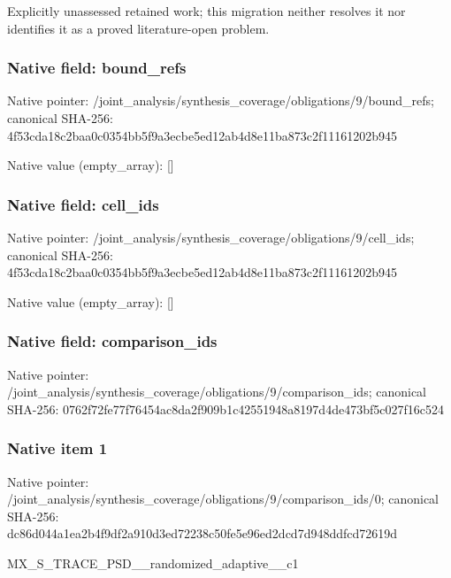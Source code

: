 \documentclass[10pt,a4paper]{article}
\begin{document}
\begingroup\raggedright\sloppy Explicitly unassessed retained work;\allowbreak{} this migration neither resolves it nor identifies it as a proved literature-open problem.\par\endgroup

\subsubsection{Native field: bound\_\allowbreak{}refs}
Native pointer: /joint\_\allowbreak{}analysis/synthesis\_\allowbreak{}coverage/obligations/9/bound\_\allowbreak{}refs; canonical SHA-256: 4f53cda18c2baa0c0354bb5f9a3ecbe5ed12ab4d8e11ba873c2f11161202b945

Native value (empty\_\allowbreak{}array): []

\subsubsection{Native field: cell\_\allowbreak{}ids}
Native pointer: /joint\_\allowbreak{}analysis/synthesis\_\allowbreak{}coverage/obligations/9/cell\_\allowbreak{}ids; canonical SHA-256: 4f53cda18c2baa0c0354bb5f9a3ecbe5ed12ab4d8e11ba873c2f11161202b945

Native value (empty\_\allowbreak{}array): []

\subsubsection{Native field: comparison\_\allowbreak{}ids}
Native pointer: /joint\_\allowbreak{}analysis/synthesis\_\allowbreak{}coverage/obligations/9/comparison\_\allowbreak{}ids; canonical SHA-256: 0762f72fe77f76454ac8da2f909b1c42551948a8197d4de473bf5c027f16c524

\subsubsection{Native item 1}
Native pointer: /joint\_\allowbreak{}analysis/synthesis\_\allowbreak{}coverage/obligations/9/comparison\_\allowbreak{}ids/0; canonical SHA-256: dc86d044a1ea2b4f9df2a910d3ed72238c50fe5e96ed2dcd7d948ddfcd72619d

\begingroup\raggedright\sloppy MX\_\allowbreak{}S\_\allowbreak{}TRACE\_\allowbreak{}PSD\_\allowbreak{}\_\allowbreak{}randomized\_\allowbreak{}adaptive\_\allowbreak{}\_\allowbreak{}c1\par\endgroup
\end{document}
